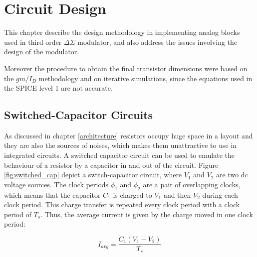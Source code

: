 \chapter{Circuit Design}
This chapter describe the design methodology in implementing analog blocks used in third order $\Delta\Sigma$ modulator, and also address the issues involving the design of the modulator. 

Moreover the procedure to obtain the final transistor dimensions were based on the $gm/I_D$ methodology and on iterative simulations, since the equations used in the SPICE level 1 are not accurate. 

\section{Switched-Capacitor Circuits}

As discussed in chapter \ref{architecture} resistors occupy huge space in a layout and they are also the sources of noises, which makes them unattractive to use in integrated circuits. A switched capacitor circuit can be used to emulate the behaviour of a resistor by a capacitor in and out of the circuit. Figure \ref{fig:switched_cap} depict a switch-capacitor circuit, where \textit{$V_1$} and \textit{$V_2$} are two dc voltage sources. The clock periods $\phi_1$ and $\phi_2$ are a pair of overlapping clocks, which means that the capacitor $C_1$ is charged to $V_1$ and then $V_2$ during each clock period. This charge transfer is repeated every clock period with a clock period of $T_s$. Thus, the average current is given by the charge moved in one clock period\cite{Johns}:  

\begin{equation}\label{sw_res}
    I_{avg} = \frac{C_1(V_1 - V_2)}{T_s}
\end{equation}

